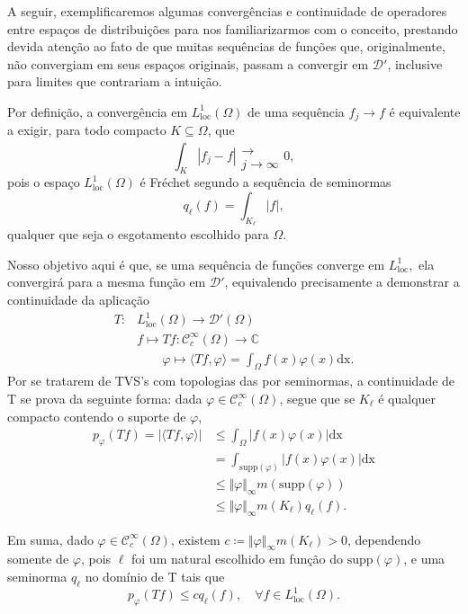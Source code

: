 \documentclass[../distribution_theory_notes.tex]{subfiles}
\begin{document}
A seguir, exemplificaremos algumas convergências e continuidade de operadores entre espaços de distribuições para nos familiarizarmos com o conceito, prestando devida atenção ao fato de que muitas sequências de funções que, originalmente, não convergiam em seus espaços originais, passam a convergir em \(\mathcal{D}'\), inclusive para limites que contrariam a intuição.

\begin{example}
	Por definição, a convergência em \(L_{\mathrm{loc}}^{1}(\Omega )\) de uma sequência \(f_{j}\to f\) é equivalente a exigir, para todo compacto \(K\subseteq \Omega \), que
	\[
		\int_{K}^{}| f_{j}-f | \substack{ \\ \longrightarrow \\ j\to \infty}0,
	\]
	pois o espaço \(L_{\mathrm{loc}}^{1}(\Omega )\) é Fréchet segundo a sequência de seminormas
	\[
		q_{\ell}(f) = \int_{K_{\ell}}^{}| f |,
	\]
	qualquer que seja o esgotamento escolhido para \(\Omega .\)

	Nosso objetivo aqui é que, se uma sequência de funções converge em \(L_{\mathrm{loc}}^{1},\) ela convergirá para a mesma função em \(\mathcal{D}'\), equivalendo precisamente a demonstrar a continuidade da aplicação
	\begin{align*}
		T: & L_{\mathrm{loc}}^{1}(\Omega )\rightarrow \mathcal{D}'(\Omega )                                           \\
		   & f\longmapsto Tf:\mathcal{C}_{c}^{\infty}(\Omega )\rightarrow \mathbb{C}                                  \\
		   & \quad \quad \varphi \mapsto \langle Tf, \varphi  \rangle = \int_{\Omega }^{}f(x)\varphi (x) \mathrm{dx}.
	\end{align*}
	Por se tratarem de TVS's com topologias das por seminormas, a continuidade de T se prova da seguinte forma: dada \(\varphi \in \mathcal{C}_{c}^{\infty}(\Omega )\), segue que se \(K_{\ell}\) é qualquer compacto contendo o suporte de \(\varphi \),
	\begin{align*}
		p_{\varphi }(Tf) = | \langle Tf, \varphi  \rangle | & \leq \int_{\Omega }^{}| f(x)\varphi (x) | \mathrm{dx}              \\
		                                                    & = \int_{\mathrm{supp}(\varphi )}^{}| f(x)\varphi (x) | \mathrm{dx} \\
		                                                    & \leq \Vert \varphi  \Vert_{\infty}m(\mathrm{supp}(\varphi ))       \\
		                                                    & \leq \Vert \varphi  \Vert_{\infty} m(K_{\ell})q_{\ell}(f).
	\end{align*}

	Em suma, dado \(\varphi \in \mathcal{C}_{c}^{\infty}(\Omega )\), existem \(c\coloneqq \Vert \varphi \Vert_{\infty}m(K_{\ell}) > 0\), dependendo somente de \(\varphi \), pois \(\ell\) foi um natural escolhido em função do \(\mathrm{supp}(\varphi )\), e uma seminorma \(q_{\ell}\) no domínio de T tais que
	\[
		p_{\varphi }(Tf)\leq c q_{\ell}(f),\quad \forall f\in L_{\mathrm{loc}}^{1}(\Omega ).
	\]
\end{example}
\end{document}
